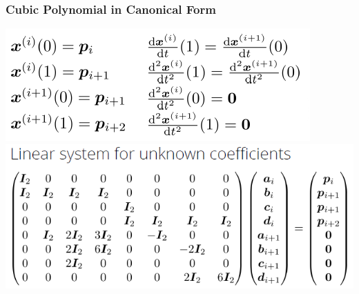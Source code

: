 \documentclass{article}
\begin{document}
\subsubsection{Cubic Polynomial in Canonical Form}
\includegraphics[scale=0.5]{image82.png}
\includegraphics[scale=0.5]{image83.png}
\end{document}
